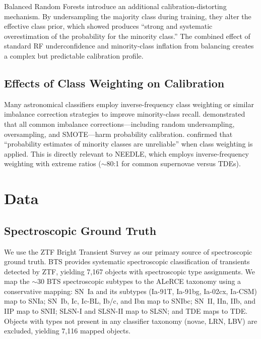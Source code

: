 \documentclass[twocolumn]{aastex631}
\begin{document}
Balanced Random Forests \citep{chen2004} introduce an additional calibration-distorting mechanism. By undersampling the majority class during training, they alter the effective class prior, which \citet{vandengoorbergh2022} showed produces ``strong and systematic overestimation of the probability for the minority class.'' The combined effect of standard RF underconfidence and minority-class inflation from balancing creates a complex but predictable calibration profile.

\subsection{Effects of Class Weighting on Calibration}

Many astronomical classifiers employ inverse-frequency class weighting or similar imbalance correction strategies to improve minority-class recall. \citet{vandengoorbergh2022} demonstrated that all common imbalance corrections---including random undersampling, oversampling, and SMOTE---harm probability calibration. \citet{fernando2021} confirmed that ``probability estimates of minority classes are unreliable'' when class weighting is applied. This is directly relevant to NEEDLE, which employs inverse-frequency weighting with extreme ratios ($\sim$80:1 for common supernovae versus TDEs).


\section{Data} \label{sec:data}

\subsection{Spectroscopic Ground Truth}

We use the ZTF Bright Transient Survey \citep[BTS;][]{fremling2020, perley2020} as our primary source of spectroscopic ground truth. BTS provides systematic spectroscopic classification of transients detected by ZTF, yielding 7,167 objects with spectroscopic type assignments. We map the $\sim$30 BTS spectroscopic subtypes to the ALeRCE taxonomy using a conservative mapping: SN~Ia and its subtypes (Ia-91T, Ia-91bg, Ia-02cx, Ia-CSM) map to SNIa; SN~Ib, Ic, Ic-BL, Ib/c, and Ibn map to SNIbc; SN~II, IIn, IIb, and IIP map to SNII; SLSN-I and SLSN-II map to SLSN; and TDE maps to TDE. Objects with types not present in any classifier taxonomy (novae, LRN, LBV) are excluded, yielding 7,116 mapped objects.
\end{document}
